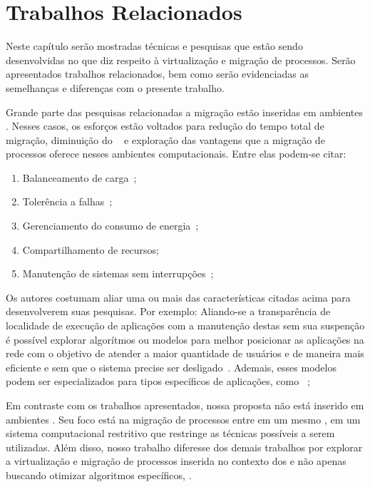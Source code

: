 \chapter{Trabalhos Relacionados}
\label{chap.related-work}

Neste capítulo serão mostradas técnicas e pesquisas que estão sendo desenvolvidas no que diz respeito à virtualização e migração de processos. Serão apresentados trabalhos relacionados, bem como serão evidenciadas as semelhanças e diferenças com o presente trabalho.

Grande parte das pesquisas relacionadas a migração estão inseridas em ambientes \cloud. Nesses casos, os esforços estão voltados para redução do tempo total de migração, diminuição do \downtime~\cite{migration-linux-conteiners,clark2005live} e exploração das vantagens que a migração de processos oferece nesses ambientes computacionais. Entre elas podem-se citar:
\begin{enumerate}[label=(\roman*)]
    \item Balanceamento de carga~\cite{live-vm-migration-techniques,ada-things};
    \item Tolerência a falhas~\cite{fernando2019live};
    \item Gerenciamento do consumo de energia~\cite{aldossary2018performance};
    \item Compartilhamento de recursos;
    \item Manutenção de sistemas sem interrupções~\cite{live-vm-migration-techniques,ada-things};
\end{enumerate}

Os autores costumam aliar uma ou mais das características citadas acima para desenvolverem suas pesquisas. Por exemplo:
    Aliando-se a transparência de localidade de execução de aplicações com a manutenção destas sem sua suspenção é possível explorar algorítmos ou modelos para melhor posicionar as aplicações na rede com o objetivo de atender a maior quantidade de usuários e de maneira mais eficiente e sem que o sistema precise ser desligado~\cite{live-migration-sdn}. Ademais, esses modelos podem ser especializados para tipos específicos de aplicações, como \iot~\cite{ada-things};

Em contraste com os trabalhos apresentados, nossa proposta não está inserido em ambientes \cloud. Seu foco está na migração de processos entre \clusters em um mesmo \chip, em um sistema computacional restritivo que restringe as técnicas possíveis a serem utilizadas. Além disso, nosso trabalho diferesse dos demais trabalhos por explorar a virtualização e migração de processos inserida no contexto dos \lws e não apenas buscando otimizar algoritmos específicos, \eg \livemigration.